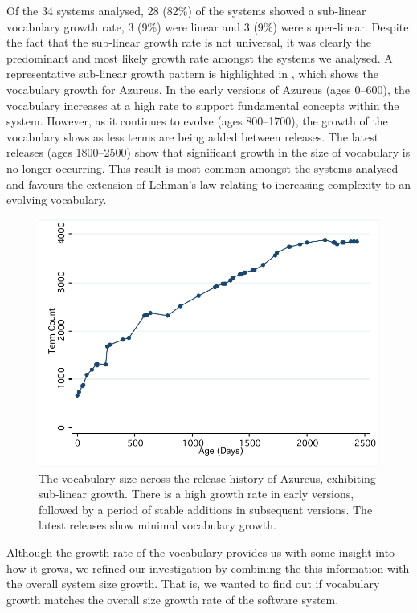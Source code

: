 Of the 34 systems analysed, 28 (82\%) of the systems showed a sub-linear vocabulary growth rate, 3 (9\%) were linear and 3 (9\%) were super-linear. Despite the fact that the sub-linear growth rate is not universal, it was clearly the predominant and most likely growth rate amongst the systems we analysed. A representative sub-linear growth pattern is highlighted in , which shows the vocabulary growth for Azureus. In the early versions of Azureus (ages 0--600), the vocabulary increases at a high rate to support fundamental concepts within the system. However, as it continues to evolve (ages 800--1700), the growth of the vocabulary slows as less terms are being added between releases. The latest releases (ages 1800--2500) show that significant growth in the size of vocabulary is no longer occurring. This result is most common amongst the systems analysed and favours the extension of Lehman's law relating to increasing complexity to an evolving vocabulary.

\begin{figure}[t]
\centering
\includegraphics[width=\textwidth]{Figures/Vocab-AzureusGrowth.pdf}
\caption{The vocabulary size across the release history of Azureus, exhibiting sub-linear growth. There is a high growth rate in early versions, followed by a period of stable additions in subsequent versions. The latest releases show minimal vocabulary growth.}
\label{fig:vocab-growth-azureus}
\end{figure}

Although the growth rate of the vocabulary provides us with some insight into how it grows, we refined our investigation by combining the this information with the overall system size growth. That is, we wanted to find out if vocabulary growth matches the overall size growth rate of the software system.

